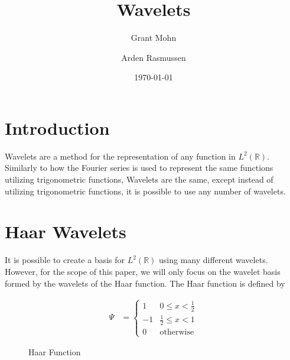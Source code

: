 \documentclass[12pt]{amsart}
\title{Wavelets}
\author{Grant Mohn \and Arden Rasmussen}
\date{\today}
\newcommand{\LP}{L^2(\mathbb{R})}
\begin{document}
\maketitle
{}

\section{Introduction}%
\label{sec:introduction}

Wavelets are a method for the representation of any function in
$\LP$. Similarly to how the Fourier series is used to represent
the same functions utilizing trigonometric functions, Wavelets are the same,
except instead of utilizing trigonometric functions, it is possible to use any
number of wavelets.

\section{Haar Wavelets}%
\label{sec:haar_wavelets}

It is possible to create a basis for $\LP$ using many different
wavelets.  However, for the scope of this paper, we will only focus on the
wavelet basis formed by the wavelets of the Haar function. The Haar function is
defined by

\begin{align}
  \Psi &= \begin{cases} 
    1  & 0\leq x < \frac{1}{2} \\
    -1 & \frac{1}{2} \leq x < 1 \\
    0  & \text{otherwise}
  \end{cases}\label{eq:haar}
\end{align}

\begin{figure}[htpb]
\begin{center}
\end{center}
\caption{Haar Function}
\label{fig:haar_function}
\end{figure}
\end{document}
